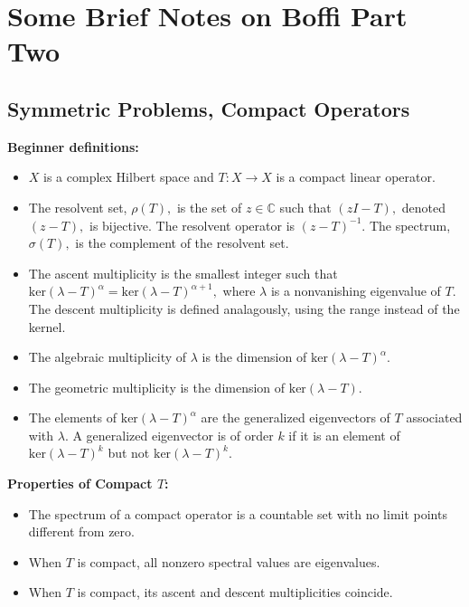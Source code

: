 \documentclass[12pt,a4paper]{article}
\theoremstyle{boldthm}
\theoremstyle{bolddefn}
\begin{document}
\section{Some Brief Notes on Boffi Part Two}

\subsection{Symmetric Problems, Compact Operators}

\textbf{Beginner definitions:}

\begin{itemize}
    \item $X$ is a complex Hilbert space and $T:X \rightarrow X$ is a compact linear operator.
    \item The resolvent set, $\rho(T),$ is the set of $z \in \mathbb{C}$ such that $(zI - T),$ denoted $(z-T),$ is bijective. The resolvent operator is $(z - T)^{-1}.$ The spectrum, $\sigma(T),$ is the complement of the resolvent set. 
    \item The ascent multiplicity is the smallest integer such that $\text{ker}(\lambda - T)^{\alpha} = \text{ker}(\lambda - T)^{\alpha + 1},$ where $\lambda$ is a nonvanishing eigenvalue of $T.$ The descent multiplicity is defined analagously, using the range instead of the kernel.
    \item The algebraic multiplicity of $\lambda$ is the dimension of $\text{ker}(\lambda - T)^{\alpha}.$
    \item The geometric multiplicity is the dimension of $\text{ker}(\lambda - T).$
    \item The elements of $\text{ker}(\lambda - T)^{\alpha}$ are the generalized eigenvectors of $T$ associated with $\lambda.$ A generalized eigenvector is of order $k$ if it is an element of $\text{ker}(\lambda - T)^{k}$ but not $\text{ker}(\lambda - T)^{k}.$
\end{itemize}

\textbf{Properties of Compact $T$:}

\begin{itemize}
    \item The spectrum of a compact operator is a countable set with no limit points different from zero. 
    \item When $T$ is compact, all nonzero spectral values are eigenvalues.
    \item When $T$ is compact, its ascent and descent multiplicities coincide.
\end{itemize}
\end{document}
